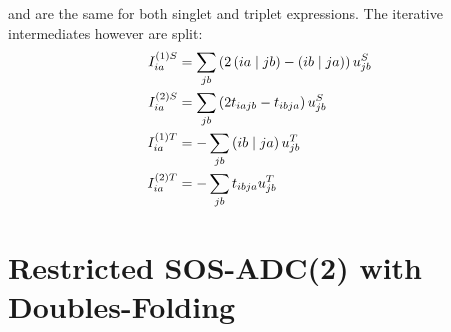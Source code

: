 \noindent and are the same for both singlet and triplet expressions. The iterative intermediates however are split:
\begin{align}
I^{(1)S}_{ia} &= \sum_{jb} \left( 2\left( ia \mid jb \right) - \left( ib \mid ja \right) \right) u_{jb}^S
\\
I^{(2)S}_{ia} &= \sum_{jb} \left( 2t_{iajb} - t_{ibja}\right) u_{jb}^S
\\
I^{(1)T}_{ia} &= - \sum_{jb} \left( ib \mid ja \right) u_{jb}^T
\\
I^{(2)T}_{ia} &= - \sum_{jb} t_{ibja} u_{jb}^T
\end{align}

\section{Restricted SOS-ADC(2) with Doubles-Folding}

